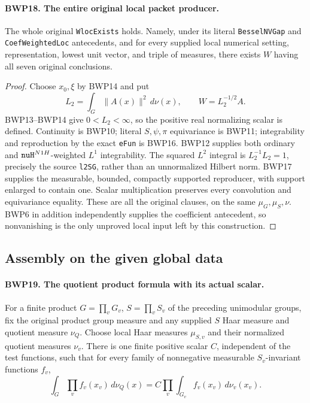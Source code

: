 \documentclass[11pt,a4paper]{article}
\numberwithin{equation}{section}
\theoremstyle{remark}\newtheorem{remark}[theorem]{Remark}
\begin{document}
\paragraph{BWP18. The entire original local packet producer.}
\label{claim:BWP18}
The whole original \texttt{Wloc\allowbreak Exists} holds.  Namely, under its
literal \texttt{Bessel\allowbreak NVGap} and \texttt{Coef\allowbreak Weighted\allowbreak Loc}
antecedents, and for every supplied local numerical setting,
representation, lowest unit vector, and triple of measures, there
exists \(W\) having all seven original conclusions.

\begin{proof}
Choose \(x_0,\xi\) by BWP14 and put
\[
 L_2=\int_G\|A(x)\|^2\,d\nu(x),\qquad W=L_2^{-1/2}A.
 \tag{BWP.24}
\]
BWP13--BWP14 give \(0<L_2<\infty\), so the positive real
normalizing scalar is defined.  Continuity is BWP10; literal
\(S,\psi,\pi\) equivariance is BWP11; integrability and reproduction
by the exact \texttt{e\allowbreak Fun} is BWP16.  BWP12 supplies both ordinary
and \(\texttt{nu\allowbreak H}^{N1H}\)-weighted \(L^1\) integrability.
The squared \(L^2\) integral is
\(L_2^{-1}L_2=1\), precisely the source \texttt{l2SG}, rather
than an unnormalized Hilbert norm.  BWP17 supplies the measurable,
bounded, compactly supported reproducer, with support enlarged to
contain one.  Scalar multiplication preserves every convolution and
equivariance equality.  These are all the original clauses, on the
same \(\mu_G,\mu_S,\nu\).  BWP6 in addition independently supplies
the coefficient antecedent, so nonvanishing is the only unproved
local input left by this construction.
\end{proof}

\subsection{Assembly on the given global data}

\paragraph{BWP19. The quotient product formula with its actual scalar.}
\label{claim:BWP19}
For a finite product \(G=\prod_vG_v\), \(S=\prod_vS_v\)
of the preceding unimodular groups, fix the original product group
measure and any supplied \(S\) Haar measure and quotient measure
\(\nu_Q\).  Choose local Haar measures \(\mu_{S,v}\) and
their normalized quotient measures \(\nu_v\).  There is one
finite positive scalar \(C\), independent of the test functions,
such that for every family of nonnegative measurable
\(S_v\)-invariant functions \(f_v\),
\[
 \int_G\prod_v f_v(x_v)\,d\nu_Q(x)
   = C\prod_v\int_{G_v} f_v(x_v)\,d\nu_v(x_v).
 \tag{BWP.25}
\]
\end{document}

